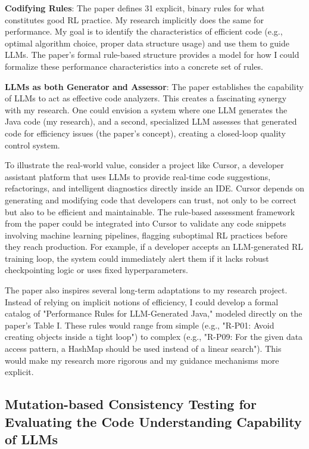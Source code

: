 \documentclass[11pt]{article}
\begin{document}
\textbf{Codifying Rules}: The paper defines 31 explicit, binary rules for what constitutes good RL practice. My research implicitly does the same for performance. My goal is to identify the characteristics of efficient code (e.g., optimal algorithm choice, proper data structure usage) and use them to guide LLMs. The paper's formal rule-based structure provides a model for how I could formalize these performance characteristics into a concrete set of rules.

\textbf{LLMs as both Generator and Assessor}: The paper establishes the capability of LLMs to act as effective code analyzers. This creates a fascinating synergy with my research. One could envision a system where one LLM generates the Java code (my research), and a second, specialized LLM assesses that generated code for efficiency issues (the paper's concept), creating a closed-loop quality control system.

To illustrate the real-world value, consider a project like Cursor, a developer assistant platform that uses LLMs to provide real-time code suggestions, refactorings, and intelligent diagnostics directly inside an IDE. Cursor depends on generating and modifying code that developers can trust, not only to be correct but also to be efficient and maintainable. The rule-based assessment framework from the paper could be integrated into Cursor to validate any code snippets involving machine learning pipelines, flagging suboptimal RL practices before they reach production. For example, if a developer accepts an LLM-generated RL training loop, the system could immediately alert them if it lacks robust checkpointing logic or uses fixed hyperparameters.

The paper also inspires several long-term adaptations to my research project. Instead of relying on implicit notions of efficiency, I could develop a formal catalog of "Performance Rules for LLM-Generated Java," modeled directly on the paper's Table I. These rules would range from simple (e.g., "R-P01: Avoid creating objects inside a tight loop") to complex (e.g., "R-P09: For the given data access pattern, a HashMap should be used instead of a linear search"). This would make my research more rigorous and my guidance mechanisms more explicit. 

\subsection{Mutation-based Consistency Testing for Evaluating the Code Understanding Capability of LLMs}
\end{document}
